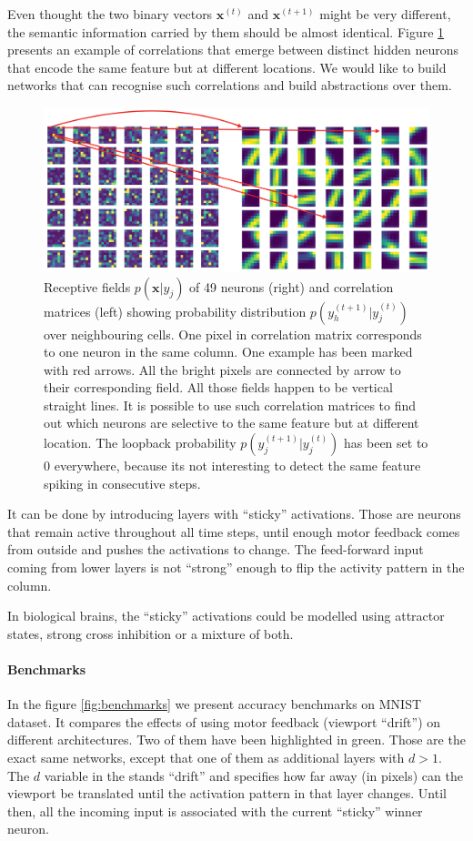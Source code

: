 \documentclass[12pt]{article}
\begin{document}
Even thought the two binary vectors $\boldsymbol{x}^{(t)}$ and $\boldsymbol{x}^{(t+1)}$ might be very different, the semantic information carried by them should be almost identical. Figure \ref{fig:motor_drift} presents an example of correlations that emerge between distinct hidden neurons that encode the same feature but at different locations. We would like to build networks that can recognise such correlations and build abstractions over them. 
\begin{figure}[!htbp]
	\centering
	\includegraphics[width=13.8cm]{motor_drift}
	\caption{Receptive fields $p(\boldsymbol{x}|y_j)$ of 49 neurons (right) and correlation matrices (left) showing probability distribution $p(y_h^{(t+1)}|y_j^{(t)})$ over neighbouring cells. One pixel in correlation matrix corresponds to one neuron in the same column. One example has been marked with red arrows. All the bright pixels are connected by arrow to their corresponding field. All those fields happen to be vertical straight lines. It is possible to use such correlation matrices to find out which neurons are selective to the same feature but at different location. The loopback probability $p(y_j^{(t+1)}|y_j^{(t)})$ has been set to $0$ everywhere, because its not interesting to detect the same feature spiking in consecutive steps.}
	\label{fig:motor_drift}
\end{figure} 
It can be done by introducing layers with ``sticky'' activations. Those are neurons that remain active throughout all time steps, until enough motor feedback comes from outside and pushes the activations to change. The feed-forward input coming from lower layers is not ``strong'' enough to flip the activity pattern in the column.

In biological brains,  the ``sticky'' activations could be modelled using attractor states, strong cross inhibition or a mixture of both.
 

\paragraph{Benchmarks} In the figure \ref{fig:benchmarks} we present accuracy benchmarks on MNIST dataset. It compares the effects of using  motor feedback (viewport ``drift'') on different architectures. Two of them have been highlighted in green. Those are the exact same networks, except that one of them as additional layers with $d>1$. The $d$ variable in the stands ``drift'' and specifies how far away (in pixels) can the viewport be translated until the activation pattern in that layer changes. Until then, all the incoming input is associated with the current ``sticky'' winner neuron. 
\end{document}
